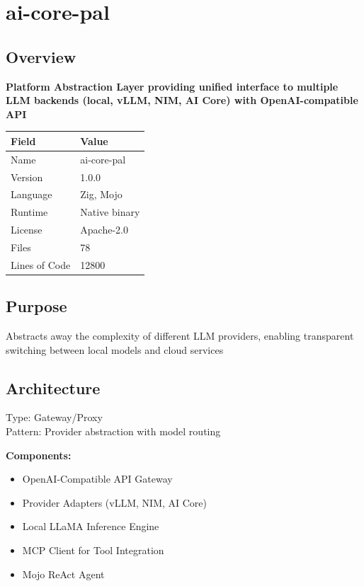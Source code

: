 \documentclass[11pt,a4paper]{article}
\begin{document}
\newpage


\section{ai-core-pal}

\subsection{Overview}

\textbf{Platform Abstraction Layer providing unified interface to multiple LLM backends (local, vLLM, NIM, AI Core) with OpenAI-compatible API}

\begin{tabular}{@{}ll@{}}
\toprule
\textbf{Field} & \textbf{Value} \\
\midrule
Name & ai-core-pal \\
Version & 1.0.0 \\
Language & Zig, Mojo \\
Runtime & Native binary \\
License & Apache-2.0 \\
Files & 78 \\
Lines of Code & 12800 \\
\bottomrule
\end{tabular}

\subsection{Purpose}
Abstracts away the complexity of different LLM providers, enabling transparent switching between local models and cloud services

\subsection{Architecture}
Type: Gateway/Proxy \\
Pattern: Provider abstraction with model routing

\textbf{Components:}\begin{itemize}[noitemsep]
\item OpenAI-Compatible API Gateway
\item Provider Adapters (vLLM, NIM, AI Core)
\item Local LLaMA Inference Engine
\item MCP Client for Tool Integration
\item Mojo ReAct Agent
\end{itemize}
\end{document}
